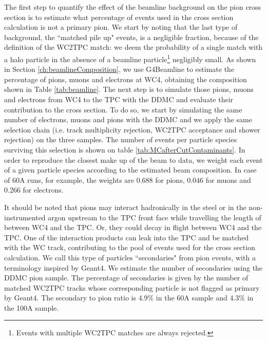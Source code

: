 The first step to quantify the effect of the beamline background on the pion cross section is to estimate what percentage of events used in the cross section calculation is not a primary pion.  We start by noting that the last type of background, the ``matched pile up" events, is a negligible fraction, because of the definition of the WC2TPC match: we deem the probability of a single match with a halo particle in the absence of a beamline particle\footnote{ Events with multiple WC2TPC matches are always rejected.} negligibly small. %
As shown in Section \ref{ch:beamlineComposition}, we use G4Beamline to estimate the percentage of pions, muons and electrons at WC4, obtaining the composition shown in Table \ref{tab:beamline}. The next step is to simulate those pions, muons and electrons from WC4 to the TPC with the DDMC and evaluate their contribution to the cross section. To do so, we start by simulating the same number of electrons, muons and pions with the DDMC and we apply the same selection chain (i.e. track multiplicity rejection, WC2TPC acceptance and shower rejection) on the three samples. The number of events per particle species surviving this selection is shown on table \ref{tab:MCafterCutContaminants}. In order to reproduce the closest make up of the beam to data, we weight each event of a given particle species according to the estimated beam composition. In case of 60A runs, for example, the weights are 0.688 for pions,  0.046 for muons  and 0.266 for electrons.


It should be noted that pions may  interact hadronically in the steel or in the non-instrumented argon upstream to the TPC front face while travelling the length of between WC4 and the TPC. Or, they could decay in flight between WC4 and the TPC. One of the interaction products can leak into the TPC and be matched with the WC track, contributing to the pool of events used for the cross section calculation. We call this type of particles ``secondaries" from pion events, with a terminology inspired by Geant4.  We estimate the number of secondaries using the DDMC pion sample.  The percentage of secondaries is given by the number of matched WC2TPC tracks whose corresponding particle is not flagged as primary by Geant4.  The secondary to pion ratio is 4.9\% in the 60A sample and 4.3\% in the 100A sample.





